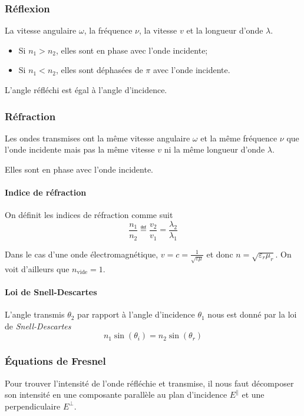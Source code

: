 \subsubsection{Réflexion}
La vitesse angulaire $\omega$, la fréquence $\nu$, la vitesse $v$ et la
longueur d'onde $\lambda$.

\begin{itemize}
  \item Si $n_1 > n_2$, elles sont en phase avec l'onde incidente;
  \item Si $n_1 < n_2$, elles sont déphasées de $\pi$ avec l'onde incidente.
\end{itemize}

L'angle réfléchi est égal à l'angle d'incidence.

\subsubsection{Réfraction}
Les ondes transmises ont la même vitesse angulaire $\omega$
et la même fréquence $\nu$ que l'onde incidente
mais pas la même vitesse $v$ ni la même longueur d'onde $\lambda$.

Elles sont en phase avec l'onde incidente.

\paragraph{Indice de réfraction}
On définit les indices de réfraction comme suit
\[ \frac{n_1}{n_2} \eqdef \frac{v_2}{v_1} = \frac{\lambda_2}{\lambda_1} \]

Dans le cas d'une onde électromagnétique,
$v = c = \frac{1}{\sqrt{\varepsilon\mu}}$ et donc
$n = \sqrt{\varepsilon_r\mu_r}$.
On voit d'ailleurs que $n_\mathrm{vide} = 1$.

\paragraph{Loi de Snell-Descartes}
L'angle transmis $\theta_2$ par rapport à l'angle d'incidence
$\theta_1$ nous est donné par la loi de \emph{Snell-Descartes}
\begin{equation}
  \label{eq:snell}
  n_1 \sin(\theta_i) = n_2 \sin(\theta_r)
\end{equation}

\subsubsection{Équations de Fresnel}
Pour trouver l'intensité de l'onde réfléchie et transmise, il nous
faut décomposer son intensité en une composante parallèle au plan d'incidence
$E^\parallel$ et une perpendiculaire $E^\perp$.

